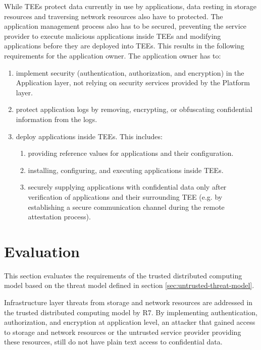 While TEEs protect data currently in use by applications, data resting in
storage resources and traversing network resources also have to protected. The
application management process also has to be secured, preventing the service
provider to execute malicious applications inside TEEs and modifying
applications before they are deployed into TEEs. This results in the following
requirements for the application owner. The application owner has to:

\begin{enumerate}[resume,label*=R\arabic*]
  \item implement security (authentication, authorization, and encryption) in
        the Application layer, not relying on security services provided by the
        Platform layer.
  \item protect application logs by removing, encrypting, or obfuscating
        confidential information from the logs.
  \item deploy applications inside TEEs. This includes:
        \begin{enumerate}[label*=.\arabic*]
          \item providing reference values for applications and their
                configuration.
          \item installing, configuring, and executing applications inside TEEs.
          \item securely supplying applications with confidential data only
                after verification of applications and their surrounding TEE
                (e.g. by establishing a secure communication channel during the
                remote attestation process).
        \end{enumerate}
\end{enumerate}


\section{Evaluation}
\label{sec:evaluation}

This section evaluates the requirements of the trusted distributed computing
model based on the threat model defined in section
\ref{sec:untrusted-threat-model}.

Infrastructure layer threats from storage and network resources are addressed in
the trusted distributed computing model by R7. By implementing authentication,
authorization, and encryption at application level, an attacker that gained
access to storage and network resources or the untrusted service provider
providing these resources, still do not have plain text access to confidential
data.

